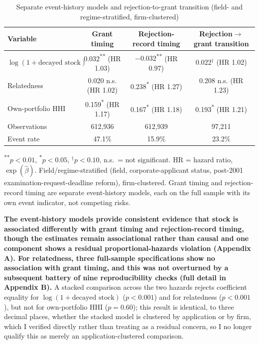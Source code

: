 \documentclass[12pt]{article}
\begin{document}
\begin{table}[htbp]
\centering
\small
\caption{Separate event-history models and rejection-to-grant transition (field- and regime-stratified, firm-clustered)}
\label{tab:block3}
\begin{tabular}{lccc}
\toprule
Variable & Grant timing & Rejection-record timing & Rejection$\to$grant transition \\
\midrule
$\log(1+\text{decayed stock})$ & 0.032\textsuperscript{**} (HR 1.03) & $-0.032$\textsuperscript{**} (HR 0.97) & 0.022$^{\dagger}$ (HR 1.02) \\
Relatedness & 0.020 n.s. (HR 1.02) & 0.238\textsuperscript{*} (HR 1.27) & 0.208 n.s. (HR 1.23) \\
Own-portfolio HHI & 0.159\textsuperscript{*} (HR 1.17) & 0.167\textsuperscript{*} (HR 1.18) & 0.193\textsuperscript{*} (HR 1.21) \\
\midrule
Observations & 612,936 & 612,939 & 97,211 \\
Event rate & 47.1\% & 15.9\% & 23.2\% \\
\bottomrule
\end{tabular}
\begin{minipage}{\textwidth}
\vspace{2pt}
\footnotesize \textsuperscript{**}$p<0.01$, \textsuperscript{*}$p<0.05$, $^{\dagger}p<0.10$, n.s.\ = not significant. HR = hazard ratio, $\exp(\hat\beta)$. Field/regime-stratified (field, corporate-applicant status, post-2001 examination-request-deadline reform), firm-clustered. Grant timing and rejection-record timing are separate event-history models, each on the full sample with its own event indicator, not competing risks.
\end{minipage}
\end{table}

\textbf{The event-history models provide consistent evidence that stock is associated differently with grant timing and rejection-record timing, though the estimates remain associational rather than causal and one component shows a residual proportional-hazards violation (Appendix A). For relatedness, three full-sample specifications show no association with grant timing, and this was not overturned by a subsequent battery of nine reproducibility checks (full detail in Appendix B).} A stacked comparison across the two hazards rejects coefficient equality for $\log(1+\text{decayed stock})$ ($p<0.001$) and for relatedness ($p<0.001$), but not for own-portfolio HHI ($p=0.60$); this result is identical, to three decimal places, whether the stacked model is clustered by application or by firm, which I verified directly rather than treating as a residual concern, so I no longer qualify this as merely an application-clustered comparison.
\end{document}
